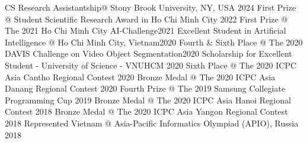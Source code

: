\begin{talks}
    \award
    {CS Research Assistantship}{}{}{@ Stony Brook University, NY, USA \hfill 2024}
    \award
    {First Prize}
    {} {} {@ Student Scientific Research Award in Ho Chi Minh City \hfill 2022}
    \award
    {First Prize}
    {} {} {@ The 2021 Ho Chi Minh City AI-Challenge\hfill 2021}
    \award
    {Excellent Student in Artificial Intelligence}
    {} {} {@ Ho Chi Minh City, Vietnam\hfill 2020}
    \award
    {Fourth \& Sixth Place}
    {} {} {@ The 2020 DAVIS Challenge on Video Object Segmentation\hfill 2020}
    \award
    {Scholarship for Excellent Student}
    {} {} {- University of Science - VNUHCM \hfill 2020}
    \award
    {Sixth Place}
    {} {} {@ The 2020 ICPC Asia Cantho Regional Contest \hfill 2020}
    \award
    {Bronze Medal}
    {} {} {@ The 2020 ICPC Asia Danang Regional Contest \hfill 2020}
    \award
    {Fourth Prize}
    {} {} {@ The 2019 Samsung Collegiate Programming Cup \hfill 2019}
    \award
    {Bronze Medal}
    {} {} {@ The 2020 ICPC Asia Hanoi Regional Contest \hfill 2018}
    \award
    {Bronze Medal}
    {} {} {@ The 2020 ICPC Asia Yangon Regional Contest \hfill 2018}
    \award
    {Represented Vietnam}
    {} {} {@ Asia-Pacific Informatics Olympiad (APIO), Russia \hfill 2018}
\end{talks}    
\vspace{-3mm}

